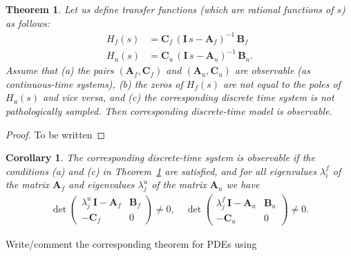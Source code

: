 \documentclass[journal]{IEEEtran}
\newtheorem{theorem}{Theorem}[section]
\newtheorem{corollary}{Corollary}[section]
\newcommand{\simo}[1]{{\color{red}#1}}
\begin{document}
\begin{theorem} \label{the:obsv}
  Let us define transfer functions (which are rational functions of $s$) as follows:
\begin{equation}
\begin{split}
  H_f(s) &= \mathbf{C}_f \, (\mathbf{I} \, s - \mathbf{A}_f)^{-1} \, \mathbf{B}_f \\
  H_u(s) &= \mathbf{C}_u \, (\mathbf{I} \, s - \mathbf{A}_u)^{-1} \, \mathbf{B}_u.
\end{split}
\end{equation}
%
Assume that (a) the pairs $(\mathbf{A}_f,\mathbf{C}_f)$ and $(\mathbf{A}_u,\mathbf{C}_u)$ are observable (as continuous-time systems), (b) the zeros of $H_f(s)$ are not equal to the poles of $H_u(s)$ and vice versa, and (c) the corresponding discrete time system is not pathologically sampled. Then corresponding discrete-time model is observable.
\end{theorem}

\begin{proof}
  \simo{To be written}
\end{proof}

\begin{corollary}
The corresponding discrete-time system is observable if the conditions (a) and (c) in Theorem~\ref{the:obsv} are satisfied, and for all eigenvalues $\lambda^f_i$ of the matrix $\mathbf{A}_f$ and eigenvalues $\lambda^u_j$ of the matrix $\mathbf{A}_u$ we have
%
\begin{equation}
\begin{split}
  \det \begin{pmatrix}
    \lambda^u_j \, \mathbf{I}-\mathbf{A}_f & \mathbf{B}_f \\ -\mathbf{C}_f & 0
    \end{pmatrix} \neq 0,
    \quad
  \det \begin{pmatrix}
    \lambda^f_j \, \mathbf{I}-\mathbf{A}_u & \mathbf{B}_u \\ -\mathbf{C}_u & 0
    \end{pmatrix} \neq 0.
\end{split}
\end{equation}
\end{corollary}

\simo{Write/comment the corresponding theorem for PDEs using \cite{Curtain:2012}}

%
\end{document}
